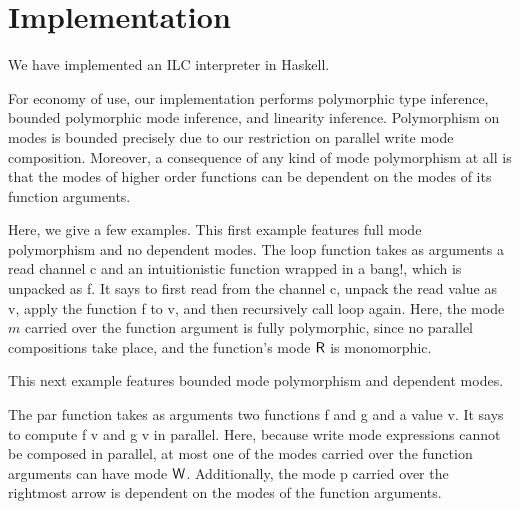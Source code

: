 \section{Implementation}
\label{sec:implementation}

We have implemented an ILC interpreter in Haskell.

For economy of use, our implementation performs polymorphic type inference,
bounded polymorphic mode inference, and linearity inference. Polymorphism on
modes is bounded precisely due to our restriction on parallel write mode
composition. Moreover, a consequence of any kind of mode polymorphism at all is
that the modes of higher order functions can be dependent on the modes of its
function arguments.

Here, we give a few examples. This first example features full mode polymorphism
and no dependent modes.   The
\textsf{loop} function takes as arguments a read channel \textsf{c} and an
intuitionistic function wrapped in a bang!, which is unpacked as \textsf{f}.  It
says to first read from the channel \textsf{c}, unpack the read value as
\textsf{v}, apply the function \textsf{f} to \textsf{v}, and then recursively
call \textsf{loop} again. Here, the mode $m$ carried over the function argument
is fully polymorphic, since no parallel compositions take place, and the
function's mode $\textsf{R}$ is monomorphic.

This next example features bounded mode polymorphism and dependent modes.

The \textsf{par} function takes as arguments two functions \textsf{f} and
\textsf{g} and a value \textsf{v}. It says to compute \textsf{f v} and \textsf{g
  v} in parallel. Here, because write mode expressions cannot be composed in
parallel, at most one of the modes carried over the function arguments can have
mode $\textsf{W}$. Additionally, the mode \textsf{p} carried over the rightmost arrow
is dependent on the modes of the function arguments.
